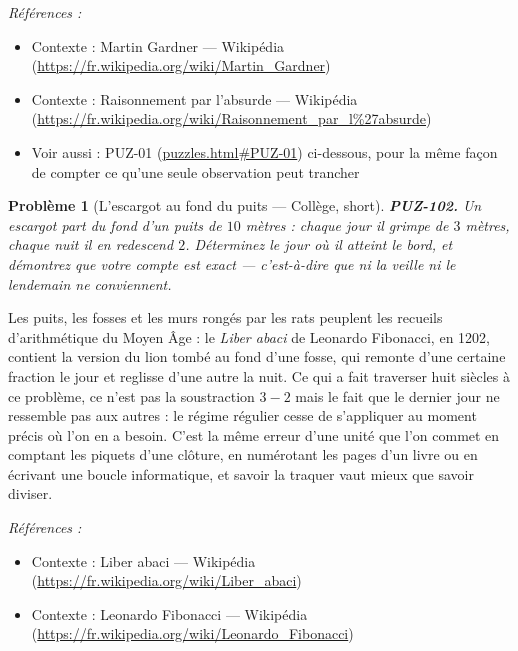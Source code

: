\documentclass[11pt]{article}
\newtheorem{problem}{Problème}
\newenvironment{refs}{\par\small\noindent\emph{Références :}\begin{itemize}\setlength\itemsep{0pt}}{\end{itemize}\normalsize}
\begin{document}
\begin{refs}
\item Contexte : Martin Gardner --- Wikipédia (\url{https://fr.wikipedia.org/wiki/Martin_Gardner})
\item Contexte : Raisonnement par l'absurde --- Wikipédia (\url{https://fr.wikipedia.org/wiki/Raisonnement_par_l%27absurde})
\item Voir aussi : PUZ-01 (\url{puzzles.html#PUZ-01}) ci-dessous, pour la même façon de compter ce qu'une seule observation peut trancher
\end{refs}

\bigskip

\begin{problem}[{L'escargot au fond du puits --- Collège, short}]
\textbf{PUZ-102.} Un escargot part du fond d'un puits de $ 10 $ mètres :
chaque jour il grimpe de $ 3 $ mètres, chaque nuit il en redescend $ 2 $. Déterminez le
jour où il atteint le bord, et démontrez que votre compte est exact --- c'est-à-dire que ni la
veille ni le lendemain ne conviennent.
\end{problem}

\noindent Les puits, les fosses et les murs rongés par les rats peuplent les recueils
d'arithmétique du Moyen Âge : le \textit{Liber abaci} de Leonardo Fibonacci, en 1202, contient
la version du lion tombé au fond d'une fosse, qui remonte d'une certaine fraction le jour et
reglisse d'une autre la nuit. Ce qui a fait traverser huit siècles à ce problème, ce n'est pas
la soustraction $ 3 - 2 $ mais le fait que le dernier jour ne ressemble pas aux autres : le
régime régulier cesse de s'appliquer au moment précis où l'on en a besoin. C'est la même
erreur d'une unité que l'on commet en comptant les piquets d'une clôture, en numérotant les
pages d'un livre ou en écrivant une boucle informatique, et savoir la traquer vaut mieux que
savoir diviser.

\begin{refs}
\item Contexte : Liber abaci --- Wikipédia (\url{https://fr.wikipedia.org/wiki/Liber_abaci})
\item Contexte : Leonardo Fibonacci --- Wikipédia (\url{https://fr.wikipedia.org/wiki/Leonardo_Fibonacci})
\end{refs}

\bigskip
\end{document}

